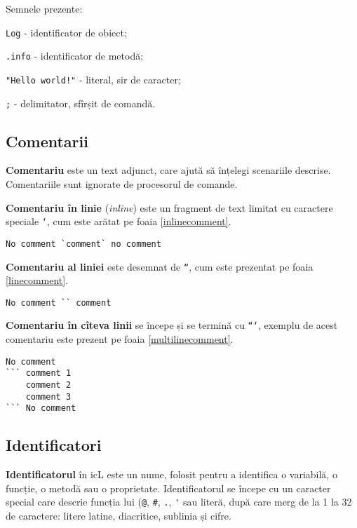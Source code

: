 Semnele prezente:
\begin{icItems}
\item
	\lstinline|Log| - identificator de obiect;
\item
	\lstinline|.info| - identificator de metodă;
\item
	\lstinline|"Hello world!"| - literal, sir de caracter;
\item
	\lstinline|;| - delimitator, sfîrșit de comandă.
\end{icItems}

\subsection{Comentarii}

\textbf{Comentariu} este un text adjunct, care ajută să înțelegi scenariile descrise. Comentariile sunt ignorate de procesorul de comande.

\textbf{Comentariu în linie} (\textit{inline}) este un fragment de text limitat cu caractere speciale \texttt{`}, cum este arătat pe foaia \ref{inlinecomment}.

\begin{lstlisting}[caption=Comentariu în linie,label=inlinecomment]
No comment `comment` no comment
\end{lstlisting}

\textbf{Comentariu al liniei} este desemnat de \texttt{``}, cum este prezentat pe foaia \ref{linecomment}.

\begin{lstlisting}[caption=Comentariu al liniei,label=linecomment]
No comment `` comment
\end{lstlisting}

\textbf{Comentariu în cîteva linii} se începe și se termină cu \texttt{```}, exemplu de acest comentariu este prezent pe foaia \ref{multilinecomment}.

\begin{lstlisting}[caption=Comentariu în cîteva linii,label=multilinecomment]
No comment
``` comment 1
	comment 2
	comment 3
``` No comment
\end{lstlisting}

\subsection{Identificatori}

\textbf{Identificatorul} în icL este un nume, folosit pentru a identifica o variabilă, o funcție, o metodă sau o proprietate. Identificatorul se începe cu un caracter special care descrie funcția lui (\lstinline|@|, \lstinline|#|, \lstinline|.|, \lstinline|'| sau literă, după care merg de la 1 la 32 de caractere: litere latine, diacritice, sublinia și cifre.

